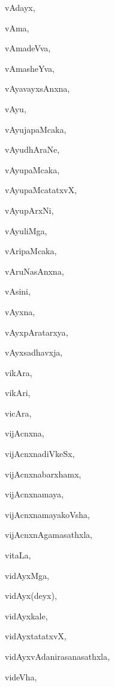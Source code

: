 \begin{multicols}{2}
{vAdayx}, \pageref{vAdayx}

{vAma}, \pageref{vAma}

{vAmadeVva}, \pageref{vAmadeVva}

{vAmasheYva}, \pageref{vAmasheYva}

{vAyavayxsAnxna}, \pageref{vAyavayxsAnxna}

{vAyu}, \pageref{vAyu}

{vAyujapaMcaka}, \pageref{vAyujapaMcaka}

{vAyudhAraNe}, \pageref{vAyudhAraNe}

{vAyupaMcaka}, \pageref{vAyupaMcaka}

{vAyupaMcatatxvX}, \pageref{vAyupaMcatatxvX}

{vAyupArxNi}, \pageref{vAyupArxNi}

{vAyuliMga}, \pageref{vAyuliMga}

{vAripaMcaka}, \pageref{vAripaMcaka}

{vAruNasAnxna}, \pageref{vAruNasAnxna}

{vAsini}, \pageref{vAsini}

{vAyxna}, \pageref{vAyxna}

{vAyxpAratarxya}, \pageref{vAyxpAratarxya}

{vAyxsadhavxja}, \pageref{vAyxsadhavxja}

{vikAra}, \pageref{vikAra}

{vikAri}, \pageref{vikAri}

{vicAra}, \pageref{vicAra}

{vijAcnxna}, \pageref{vijAcnxna}

{vijAcnxnadiVkeSx}, \pageref{vijAcnxnadiVkeSx}

{vijAcnxnabarxhamx}, \pageref{vijAcnxnabarxhamx}

{vijAcnxnamaya}, \pageref{vijAcnxnamaya}

{vijAcnxnamayakoVsha}, \pageref{vijAcnxnamayakoVsha}

{vijAcnxnAgamasathxla}, \pageref{vijAcnxnAgamasathxla}

{vitaLa}, \pageref{vitaLa}

{vidAyxMga}, \pageref{vidAyxMga}

{vidAyx(deyx)}, \pageref{vidAyxdeyx}

{vidAyxkale}, \pageref{vidAyxkale}

{vidAyxtatatxvX}, \pageref{vidAyxtatatxvX}

{vidAyxvAdanirasanasathxla}, \pageref{vidAyxvAdanirasanasathxla}

{videVha}, \pageref{videVha}


\end{multicols}
